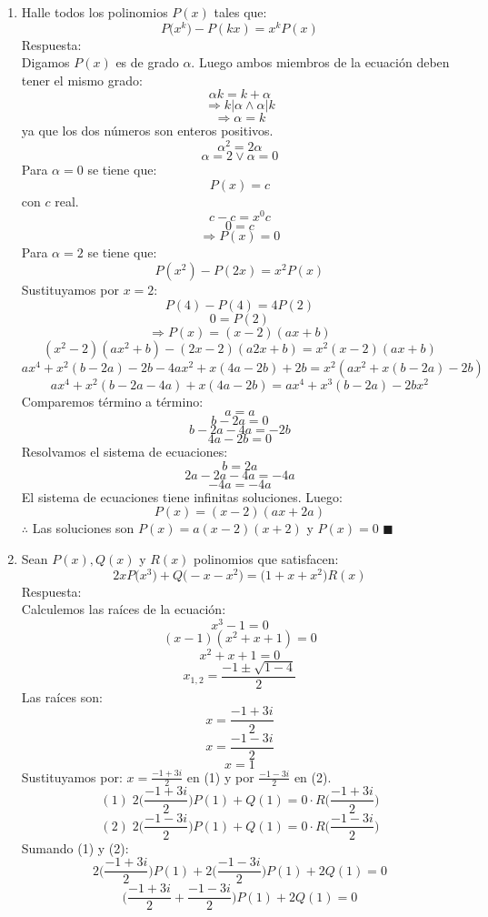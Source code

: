 \documentclass{book}
\begin{document}
\begin{enumerate}
    \item Halle todos los polinomios $P(x)$ tales que:
          $$P\big(x^k\big)-P(kx)=x^kP(x)$$
          Respuesta:\\
          Digamos $P(x)$ es de grado $\alpha$. Luego ambos miembros de la ecuación deben tener el mismo grado:
          $$\alpha k=k+\alpha$$
          $$\Rightarrow k|\alpha \wedge \alpha|k$$
          $$\Rightarrow\alpha=k $$
          ya que los dos números son enteros positivos.
          $$\alpha^2=2\alpha$$
          $$\alpha=2 \vee \alpha=0$$
          Para $\alpha=0$ se tiene que:
          $$P(x)=c$$
          con $c$ real.
          $$c-c=x^0 c$$
          $$0=c$$
          $$\Rightarrow P(x)=0$$
          Para $\alpha=2$ se tiene que:
          $$P(x^2 )-P(2x)=x^2 P(x)$$
          Sustituyamos por $x=2$:
          $$P(4)-P(4)=4P(2)$$
          $$0=P(2)$$
          $$\Rightarrow P(x)=(x-2)(ax+b)$$
          $$(x^2-2)(ax^2+b)-(2x-2)(a2x+b)=x^2 (x-2)(ax+b)$$
          $$ax^4+x^2 (b-2a)-2b-4ax^2+x(4a-2b)+2b=x^2 (ax^2+x(b-2a)-2b)$$
          $$ax^4+x^2 (b-2a-4a)+x(4a-2b)=ax^4+x^3 (b-2a)-2bx^2$$
          Comparemos término a término:
          $$a=a$$
          $$b-2a=0$$
          $$b-2a-4a=-2b$$
          $$4a-2b=0$$
          Resolvamos el sistema de ecuaciones:
          $$b=2a$$
          $$2a-2a-4a=-4a$$
          $$-4a=-4a$$
          El sistema de ecuaciones tiene infinitas soluciones. Luego:
          $$P(x)=(x-2)(ax+2a)$$
          $\therefore$ Las soluciones son $P(x)=a(x-2)(x+2)$ y $P(x)=0$ $\blacksquare$\\
    \item Sean $P(x),Q(x)$ y $R(x)$ polinomios que satisfacen:
          $$2xP\big(x^3\big)+Q\big(-x-x^2\big)=\big(1+x+x^2\big)R(x)$$
          Respuesta:\\
          Calculemos las raíces de la ecuación:
          $$x^3-1=0$$
          $$(x-1)(x^2+x+1)=0$$
          $$x^2+x+1=0$$
          $$x_{1,2}=\frac{-1\pm\sqrt{1-4}}{2}$$
          Las raíces son:
          $$x=\frac{-1+3i}{2}$$
          $$x=\frac{-1-3i}{2}$$
          $$x=1$$
          Sustituyamos por:  $\displaystyle{x=\frac{-1+3i}{2}}$ en (1) y por $\displaystyle{\frac{-1-3i}{2}}$ en (2).
          $$(1) \;   2\bigg(\frac{-1+3i}{2}\bigg)P(1)+Q(1)=0\cdot R\bigg(\frac{-1+3i}{2}\bigg)$$
          $$ (2)\;     2\bigg(\frac{-1-3i}{2}\bigg)P(1)+Q(1)=0\cdot R\bigg(\frac{-1-3i}{2}\bigg)$$
          Sumando (1) y (2):
          $$ 2\bigg(\frac{-1+3i}{2}\bigg)P(1)+2\bigg(\frac{-1-3i}{2}\bigg)P(1)+2Q(1)=0$$
          $$ \bigg(\frac{-1+3i}{2}+\frac{-1-3i}{2}\bigg)P(1)+2Q(1)=0$$

\end{enumerate}
\end{document}
